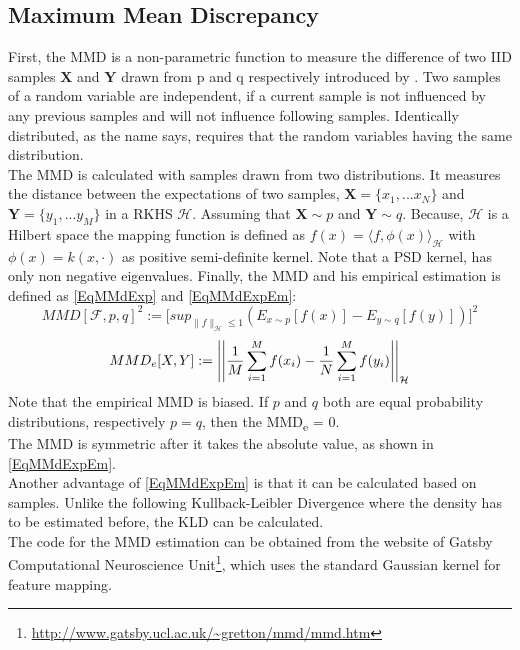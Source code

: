 \subsection{Maximum Mean Discrepancy}\label{TlSubSecMMD}
First, the \acl{MMD} is a non-parametric function to measure the difference of two \ac{IID} samples $\mathbf{X}$ and $\mathbf{Y}$ drawn from p and q respectively introduced by \cite[p. 724-728]{Gretton.2012}.
Two samples of a random variable are independent, if a current sample is not influenced by any previous samples and will not influence following samples.
Identically  distributed, as the name says, requires that the random variables having the same distribution.\cite[p. 7-8]{Czado.2011}\\
The \acs{MMD} is calculated with samples drawn from two distributions.
It measures the distance between the expectations of two samples, $\textbf{X}=\{x_1,...x_N\}$ and $\textbf{Y}=\{y_1,...y_M\}$
in a \ac{RKHS} $\mathcal{H}$.
Assuming that $\mathbf{X} \sim p$ and $\mathbf{Y} \sim q$.
Because, $\mathcal{H}$ is a Hilbert space the mapping function is defined as $f(x) = \langle f,\phi(x) \rangle_\mathcal{H}$ with $\phi(x) = k(x,\cdot)$ as positive semi-definite kernel.
Note that a \ac{PSD} kernel, has only non negative eigenvalues.\cite[p. 30]{Scholkopf.2001}
Finally, the \acs{MMD} and his empirical estimation is defined as \eqref{EqMMdExp} and \eqref{EqMMdExpEm}:\cite[p. 726-727]{Gretton.2012}
\begin{equation}\label{EqMMdExp}
MMD[\mathcal{F},p,q]^2:=\big[sup_{\|f\|_\mathcal{H} \le 1 }(E_{x\sim p}[f(x)] - E_{y\sim q}[f(y)])\big]^2
\end{equation}
\begin{equation}\label{EqMMdExpEm}
MMD_e[X,Y]:= \left\vert\left\vert\frac{1}{M}\sum_{i=1}^{M}f(x_i) - \frac{1}{N}\sum_{i=1}^{M}f(y_i)\right\vert\right\vert_{\mathcal{H}}
\end{equation}
Note that the empirical \acs{MMD} is biased.
If $p$ and $q$ both are equal probability distributions, respectively $p = q$, then the \ac{MMD}\textsubscript{e} = 0.\cite[p. 726-727]{Gretton.2012}\\
The \acs{MMD} is symmetric after it takes the absolute value, as shown in \eqref{EqMMdExpEm}.\\
Another advantage of \eqref{EqMMdExpEm} is that it can be calculated based on samples.
Unlike the following Kullback-Leibler Divergence where the density has to be estimated before, the \acs{KLD} can be calculated.\cite{Long.2015}\\
The code for the \acs{MMD} estimation can be obtained from the website of Gatsby Computational Neuroscience Unit\footnote{\url{http://www.gatsby.ucl.ac.uk/~gretton/mmd/mmd.htm}}, which uses the standard Gaussian kernel for feature mapping.

